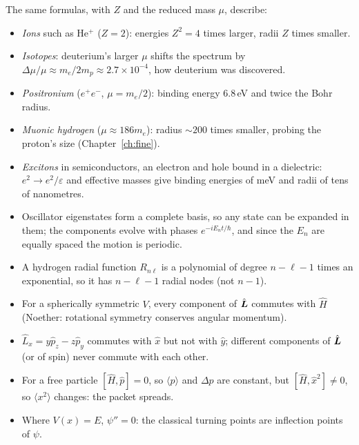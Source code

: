 \begin{example}
The same formulas, with $Z$ and the reduced mass $\mu$, describe:
\begin{itemize}
    \item \emph{Ions} such as He$^+$ ($Z = 2$): energies $Z^2 = 4$ times larger, radii $Z$ times smaller.
    \item \emph{Isotopes}: deuterium's larger $\mu$ shifts the spectrum by $\Delta\mu/\mu\approx m_e/2m_p\approx2.7\times10^{-4}$, how deuterium was discovered.
    \item \emph{Positronium} ($e^+e^-$, $\mu = m_e/2$): binding energy $6.8$\,eV and twice the Bohr radius.
    \item \emph{Muonic hydrogen} ($\mu\approx186m_e$): radius $\sim200$ times smaller, probing the proton's size (Chapter~\ref{ch:fine}).
    \item \emph{Excitons} in semiconductors, an electron and hole bound in a dielectric: $e^2\to e^2/\varepsilon$ and effective masses give binding energies of meV and radii of tens of nanometres.
\end{itemize}
\end{example}

\begin{fact}
\leavevmode
\begin{itemize}
    \item Oscillator eigenstates form a complete basis, so any state can be expanded in them; the components evolve with phases $e^{-iE_nt/\hbar}$, and since the $E_n$ are equally spaced the motion is periodic.
    \item A hydrogen radial function $R_{n\ell}$ is a polynomial of degree $n-\ell-1$ times an exponential, so it has $n-\ell-1$ radial nodes (not $n-1$).
    \item For a spherically symmetric $V$, every component of $\hat{\vect{L}}$ commutes with $\hat{H}$ (Noether: rotational symmetry conserves angular momentum).
    \item $\hat{L}_x = y\hat{p}_z - z\hat{p}_y$ commutes with $\hat{x}$ but not with $\hat{y}$; different components of $\hat{\vect{L}}$ (or of spin) never commute with each other.
    \item For a free particle $[\hat{H},\hat{p}] = 0$, so $\langle p\rangle$ and $\Delta p$ are constant, but $[\hat{H},\hat{x}^2]\neq0$, so $\langle x^2\rangle$ changes: the packet spreads.
    \item Where $V(x) = E$, $\psi'' = 0$: the classical turning points are inflection points of $\psi$.
\end{itemize}
\end{fact}

